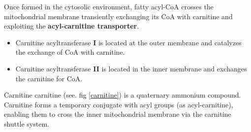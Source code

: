 \documentclass[../main.tex]{subfiles}
\begin{document}
\begin{figure}[H]
	\centering
	\hfil
	\caption{}
\end{figure}
\noindent
Once formed in the cytosolic environment, fatty acyl-CoA crosses the mitochondrial membrane transiently exchanging its CoA with carnitine and exploiting the \textbf{acyl-carnitine transporter}.
\begin{itemize}
	\item Carnitine acyltransferase \textbf{I} is located at the outer membrane and catalyzes the exchange of CoA with carnitine. 
	\item Carnitine acyltransferase \textbf{II} is located in the inner membrane and exchanges the carnitine for CoA. 
\end{itemize}
		
\begin{DefWithTitle}{Carnitine}
	\gls{carnitine} (see. fig \ref{carnitine}) is a quaternary ammonium compound. Carnitine forms a temporary conjugate with acyl groups (as acyl-carnitine), enabling them to cross the inner mitochondrial membrane via the carnitine shuttle system.
\end{DefWithTitle}
\end{document}
